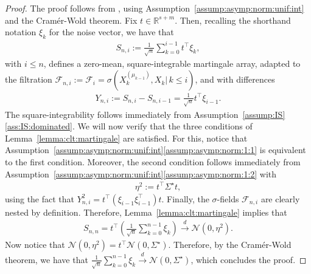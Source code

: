 \documentclass[11pt,a4paper]{article}
\theoremstyle{definition}
\begin{document}
\begin{proof}
The proof follows from \cite[Corollary~3.1]{hall2014martingale}, using Assumption~\ref{assump:asymp:norm:unif:int} and the Cramér-Wold theorem. Fix $t \in \mathbb R^{s+m}$. Then, recalling the shorthand notation $\xi_k$ for the noise vector, we have that
\begin{align*}
    S_{n, i} := \frac{1}{\sqrt{n}} \sum_{k=0}^{i-1} t^\top \xi_k,
\end{align*}
with $i \leq n$, defines a zero-mean, square-integrable martingale array, adapted to the filtration $\mathcal F_{n,i} := \mathcal F_i = \sigma(X_k^{(\mu_{k-1})}, X_k |\, k \leq i)$, and with differences
\begin{align*}
    Y_{n,i} := S_{n,i} - S_{n,i-1} = \frac{1}{\sqrt{n}} t^\top \xi_{i-1}.
\end{align*}
The square-integrability follows immediately from Assumption~\ref{assump:IS}\ref{ass:IS:dominated}. We will now verify that the three conditions of Lemma~\ref{lemma:clt:martingale} are satisfied. For this, notice that Assumption~\ref{assump:asymp:norm:unif:int}\ref{assump:asymp:norm:1:1} is equivalent to the first condition. Moreover, the second condition follows immediately from Assumption~\ref{assump:asymp:norm:unif:int}\ref{assump:asymp:norm:1:2} with
\begin{align*}
     \eta^2 := t^\top \Sigma^\star t,
\end{align*}
using the fact that $Y_{n,i}^2 = t^\top \left(\xi_{i-1} \xi_{i-1}^\top\right) t$. Finally, the $\sigma$-fields $\mathcal F_{n,i}$ are clearly nested by definition. Therefore, Lemma~\ref{lemma:clt:martingale} implies that
\begin{align*}
    S_{n,n} =  t^\top \left( \frac{1}{\sqrt{n}} \sum_{k=0}^{n-1} \xi_k \right) \overset{d}{\to} \mathcal N \left (0, \eta^2 \right).
\end{align*}
Now notice that $\mathcal N \left (0, \eta^2 \right) = t^\top \mathcal N(0, \Sigma^\star)$. Therefore, by the Cramér-Wold theorem, we have that $\frac{1}{\sqrt{n}} \sum_{k=0}^{n-1} \xi_k \overset{d}{\to} \mathcal N(0, \Sigma^\star)$, which concludes the proof.
\end{proof}


	
\end{document}
